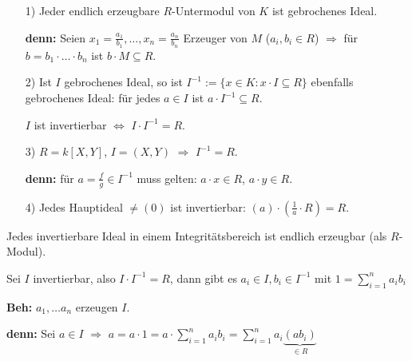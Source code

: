 \begin{nnBsp}
\begin{enumerate}
\item[1)] Jeder endlich erzeugbare $R$-Untermodul von $K$ ist gebrochenes Ideal.

\textbf{denn:} Seien $x_1 = \frac{a_1}{b_1}, \ldots, x_n = \frac{a_n}{b_n}$ Erzeuger von $M$ ($a_i, b_i \in R$) $\Rightarrow$ f\"ur $b = b_1 \cdot \ldots \cdot b_n$ ist $b \cdot M \subseteq R$.

\item[2)] Ist $I$ gebrochenes Ideal, so ist $I^{-1} := \{ x \in K : x \cdot I \subseteq R \}$ ebenfalls gebrochenes Ideal: f\"ur jedes $a \in I$ ist $a \cdot I^{-1} \subseteq R$.

$I$ ist invertierbar $\Leftrightarrow$ $I \cdot I^{-1} = R$.

\item[3)] $R = k[X,Y]$, $I = (X,Y)$ $\Rightarrow$ $I^{-1} = R$.

\textbf{denn:} f\"ur $a = \frac{f}{g} \in I^{-1}$ muss gelten: $a \cdot x \in R$, $a \cdot y \in R$.

\item[4)] Jedes Hauptideal $\neq (0)$ ist invertierbar: $(a) \cdot (\frac{1}{a} \cdot R) = R$.
\end{enumerate}
\end{nnBsp}

\begin{Bem}\label{2.41}
Jedes invertierbare Ideal in einem Integrit\"atsbereich ist endlich erzeugbar (als $R$-Modul).

\begin{Bew}
Sei $I$ invertierbar, also $I \cdot I^{-1} = R$, dann gibt es $a_i \in I, b_i \in I^{-1}$ mit $1 = \sum_{i=1}^{n} a_i b_i$

\textbf{Beh:} $a_1, \ldots a_n$ erzeugen $I$.

\textbf{denn:} Sei $a \in I$ $\Rightarrow$ $a = a \cdot 1 = a \cdot \sum_{i=1}^{n} a_i b_i = \sum_{i=1}^{n} a_i \underbrace{(a b_i)}_{\in R}$

\end{Bew}
\end{Bem}

